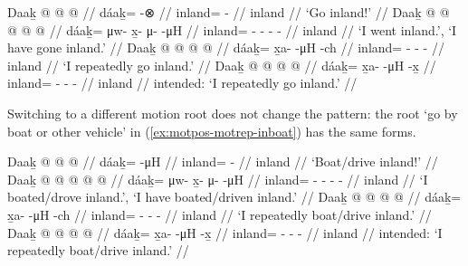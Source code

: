 \documentclass[12pt,letterpaper,oneside,article]{memoir}
\begin{document}
\pex\label{ex:motpos-motrep-inland}%
\a\label{ex:motpos-motrep-inland-imp}%
%
\begingl
	\gla	Daaḵ @  @ {} @ {} //
	\glb	dáaḵ= {}  -⊗ //
	\glc	inland= \·  - //
	\gld	inland  {} {} //
	\glft	‘Go inland!’
		//
\endgl
\a\label{ex:motpos-motrep-inland-pfv}%
%
\begingl
	\gla	Daaḵ @  @ {} @ {} @ {} @ {} //
	\glb	dáaḵ= μw- x̱- μ-  -μH //
	\glc	inland= - - -  - //
	\gld	inland  {} {} {} {} //
	\glft	‘I went inland.’, ‘I have gone inland.’
		//
\endgl
\a\label{ex:motpos-motrep-inland-repch}%
%
\begingl
	\gla	Daaḵ @  @ {} @ {} @ {} //
	\glb	dáaḵ= x̱a-  -μH -ch //
	\glc	inland= -  - - //
	\gld	inland  {} {} {} //
	\glft	‘I repeatedly go inland.’
		//
\endgl
\a\label{ex:motpos-motrep-inland-repxh}%
\ljudge{*}%
%
\begingl
	\gla	Daaḵ @  @ {} @ {} @ {} //
	\glb	dáaḵ= x̱a-  -μH -x̱ //
	\glc	inland= -  - - //
	\gld	inland  {} {} {} //
	\glft	intended: ‘I repeatedly go inland.’
		//
\endgl
\xe

Switching to a different motion root does not change the pattern:
the root  ‘go by boat or other vehicle’ in (\ref{ex:motpos-motrep-inboat}) has the same forms.

\pex\label{ex:motpos-motrep-inboat}%
\a\label{ex:motpos-motrep-inboat-imp}%
%
\begingl
	\gla	Daaḵ @  @ {} @ {} //
	\glb	dáaḵ= {}  -μH //
	\glc	inland= \·  - //
	\gld	inland  {} {} //
	\glft	‘Boat/drive inland!’
		//
\endgl
\a\label{ex:motpos-motrep-inboat-pfv}%
%
\begingl
	\gla	Daaḵ @  @ {} @ {} @ {} @ {} //
	\glb	dáaḵ= μw- x̱- μ-  -μH //
	\glc	inland= - - -  - //
	\gld	inland  {} {} {} {} //
	\glft	‘I boated/drove inland.’, ‘I have boated/driven inland.’
		//
\endgl
\a\label{ex:motpos-motrep-inboat-repch}%
%
\begingl
	\gla	Daaḵ @  @ {} @ {} @ {} //
	\glb	dáaḵ= x̱a-  -μH -ch //
	\glc	inland= -  - - //
	\gld	inland  {} {} {} //
	\glft	‘I repeatedly boat/drive inland.’
		//
\endgl
\a\label{ex:motpos-motrep-inboat-repxh}%
\ljudge{*}%
%
\begingl
	\gla	Daaḵ @  @ {} @ {} @ {} //
	\glb	dáaḵ= x̱a-  -μH -x̱ //
	\glc	inland= -  - - //
	\gld	inland  {} {} {} //
	\glft	intended: ‘I repeatedly boat/drive inland.’
		//
\endgl
\xe
\end{document}
